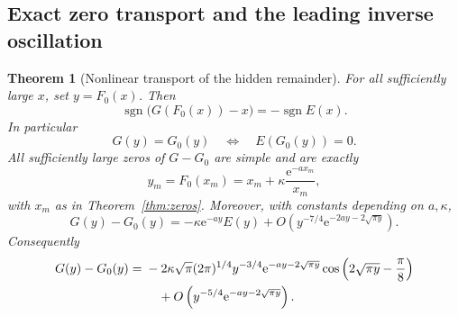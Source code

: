 \documentclass[11pt,a4paper]{article}
\newtheorem{theorem}{Theorem}[section]
\theoremstyle{definition}
\theoremstyle{remark}
\newcommand{\sgn}{\operatorname{sgn}}
\newcommand{\e}{\mathrm e}
\numberwithin{equation}{section}
\begin{document}
\subsection{Exact zero transport and the leading inverse oscillation}

\begin{theorem}[Nonlinear transport of the hidden remainder]\label{thm:transport}
For all sufficiently large $x$, set $y=F_0(x)$. Then
\begin{equation}\label{eq:exactsign}
 \sgn\bigl(G(F_0(x))-x\bigr)=-\sgn E(x).
\end{equation}
In particular
\begin{equation}\label{eq:exactzeros}
 G(y)=G_0(y)\quad\Longleftrightarrow\quad E(G_0(y))=0.
\end{equation}
All sufficiently large zeros of $G-G_0$ are simple and are exactly
\begin{equation}\label{eq:yzeros}
 y_m=F_0(x_m)=x_m+\kappa\frac{\e^{-ax_m}}{x_m},
\end{equation}
with $x_m$ as in Theorem~\ref{thm:zeros}.
Moreover, with constants depending on $a,\kappa$,
\begin{equation}\label{eq:inverseEerror}
 G(y)-G_0(y)
 =-\kappa\e^{-ay}E(y)
   +O\left(y^{-7/4}\e^{-2ay-2\sqrt{\pi y}}\right).
\end{equation}
Consequently
\begin{align}\label{eq:inverseleading}
 G(y)-G_0(y)
 ={}&-2\kappa\sqrt\pi(2\pi)^{1/4}y^{-3/4}
       \e^{-ay-2\sqrt{\pi y}}
       \cos\left(2\sqrt{\pi y}-\frac\pi8\right)\\
 &\quad+O\left(y^{-5/4}\e^{-ay-2\sqrt{\pi y}}\right).\notag
\end{align}
\end{theorem}
\end{document}
